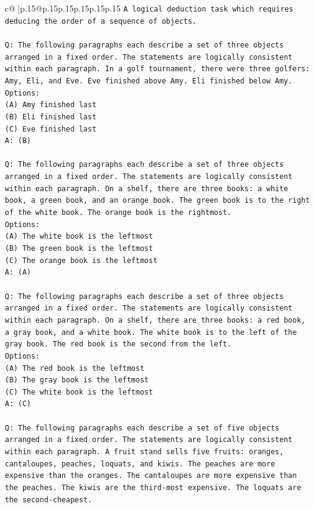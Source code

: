 \documentclass{article}
\begin{document}
{\begin{supertabular}{c@{$\;$}|p{.15\linewidth}@{}p{.15\linewidth}p{.15\linewidth}p{.15\linewidth}p{.15\linewidth}p{.15\linewidth}}
{{{\texttt{A logical deduction task which requires deducing the order of a sequence of objects.} \\
\\ 
\texttt{Q: The following paragraphs each describe a set of three objects arranged in a fixed order. The statements are logically consistent within each paragraph. In a golf tournament, there were three golfers: Amy, Eli, and Eve. Eve finished above Amy. Eli finished below Amy.} \\
\texttt{Options:} \\
\texttt{(A) Amy finished last} \\
\texttt{(B) Eli finished last} \\
\texttt{(C) Eve finished last} \\
\texttt{A: (B)} \\
\\ 
\texttt{Q: The following paragraphs each describe a set of three objects arranged in a fixed order. The statements are logically consistent within each paragraph. On a shelf, there are three books: a white book, a green book, and an orange book. The green book is to the right of the white book. The orange book is the rightmost.} \\
\texttt{Options:} \\
\texttt{(A) The white book is the leftmost} \\
\texttt{(B) The green book is the leftmost} \\
\texttt{(C) The orange book is the leftmost} \\
\texttt{A: (A)} \\
\\ 
\texttt{Q: The following paragraphs each describe a set of three objects arranged in a fixed order. The statements are logically consistent within each paragraph. On a shelf, there are three books: a red book, a gray book, and a white book. The white book is to the left of the gray book. The red book is the second from the left.} \\
\texttt{Options:} \\
\texttt{(A) The red book is the leftmost} \\
\texttt{(B) The gray book is the leftmost} \\
\texttt{(C) The white book is the leftmost} \\
\texttt{A: (C)} \\
\\ 
\texttt{Q: The following paragraphs each describe a set of five objects arranged in a fixed order. The statements are logically consistent within each paragraph. A fruit stand sells five fruits: oranges, cantaloupes, peaches, loquats, and kiwis. The peaches are more expensive than the oranges. The cantaloupes are more expensive than the peaches. The kiwis are the third{-}most expensive. The loquats are the second{-}cheapest.} \\
}}}
\end{supertabular}}
\end{document}
